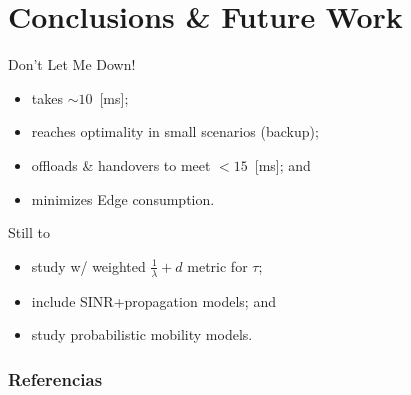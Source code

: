 \documentclass[aspectratio=169,dvipsnames]{beamer}
\begin{document}
\section{Conclusions \& Future Work}
\begin{frame}{\secname}
    Don't Let Me Down!
    \begin{itemize}
        \item takes $\sim 10$~[ms];
        \item reaches optimality in small scenarios (backup);
        \item offloads \& handovers to meet $<15$~[ms]; and
        \item minimizes Edge consumption.
    \end{itemize}

    \vfill

    Still to
    \begin{itemize}
        \item study w/ weighted $\tfrac{1}{\lambda}+d$
            metric for $\tau$;
        \item include SINR+propagation models; and
        \item study probabilistic mobility models.
    \end{itemize}
\end{frame}



\begin{frame}[allowframebreaks]
        \frametitle{Referencias}
        
        
\end{frame}
\end{document}
